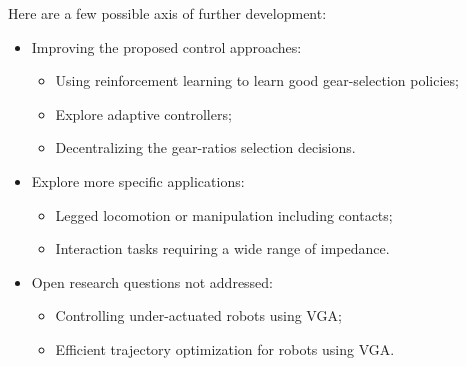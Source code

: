 Here are a few possible axis of further development: 

\begin{itemize}
		\item Improving the proposed control approaches:
		\begin{itemize}
			\item Using reinforcement learning to learn good gear-selection policies;
			\item Explore adaptive controllers;
			\item Decentralizing the gear-ratios selection decisions.
		\end{itemize}
		\item Explore more specific applications:
		\begin{itemize}
			\item Legged locomotion or manipulation including contacts;
			\item Interaction tasks requiring a wide range of impedance.
		\end{itemize}
		\item Open research questions not addressed:
		\begin{itemize}
			\item Controlling under-actuated robots using VGA;
			\item Efficient trajectory optimization for robots using VGA.
		\end{itemize}
\end{itemize}